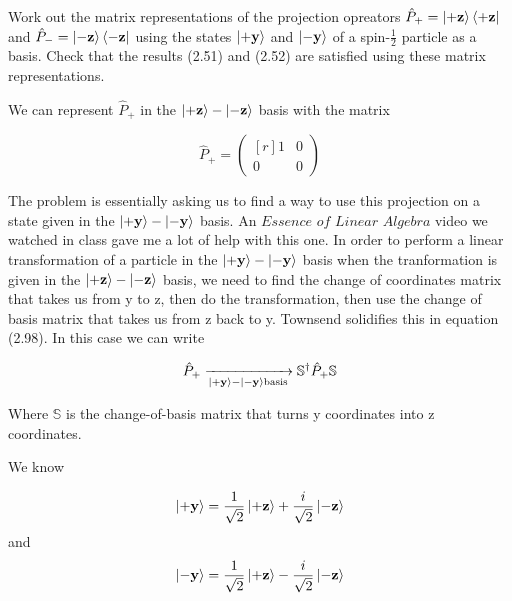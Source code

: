 \documentclass[11pt]{amsart}
\begin{document}
\begin{center}                                                                                     %
\begin{tcolorbox} [title=2.7 \hfill Isaac Baer, halign title=center]

Work out the matrix representations of the projection opreators $\hat{P}_+=\ket{+\textbf{z}}\bra{+\textbf{z}}$ and $\hat{P}_-=\ket{-\textbf{z}}\bra{-\textbf{z}}$ using the states $\ket{+\textbf{y}}$ and $\ket{-\textbf{y}}$ of a spin-$\frac{1}{2}$ particle as a basis. Check that the results (2.51) and (2.52) are satisfied using these matrix representations.

\end{tcolorbox}
\end{center}

\vspace{10mm}

We can represent $\hat{P}_+$ in the $\ket{+\textbf{z}}-\ket{-\textbf{z}}$ basis with the matrix

\[
\hat{P}_+=
\begin{pmatrix*}[r]
1&0\\
0&0
\end{pmatrix*}
\]

The problem is essentially asking us to find a way to use this projection on a state given in the $\ket{+\textbf{y}}-\ket{-\textbf{y}}$ basis. An $\textit{Essence of Linear Algebra}$ video we watched in class gave me a lot of help with this one. In order to perform a linear transformation of a particle in the $\ket{+\textbf{y}}-\ket{-\textbf{y}}$ basis when the tranformation is given in the $\ket{+\textbf{z}}-\ket{-\textbf{z}}$ basis, we need to find the change of coordinates matrix that takes us from y to z, then do the transformation, then use the change of basis matrix that takes us from z back to y. Townsend solidifies this in equation (2.98). In this case we can write

\[
\hat{P}_+\xrightarrow[\ket{+\textbf{y}}-\ket{-\textbf{y}}\text{basis}]{}\mathbb{S}^{\dagger}\hat{P}_+\mathbb{S} %
\]

Where $\mathbb{S}$ is the change-of-basis matrix that turns y coordinates into z coordinates. 

We know 

\[
\ket{+\textbf{y}}=\frac{1}{\sqrt{2}}\ket{+\textbf{z}}+\frac{i}{\sqrt{2}}\ket{-\textbf{z}}
\]
and
\[
\ket{-\textbf{y}}=\frac{1}{\sqrt{2}}\ket{+\textbf{z}}-\frac{i}{\sqrt{2}}\ket{-\textbf{z}}
\]
\end{document}
